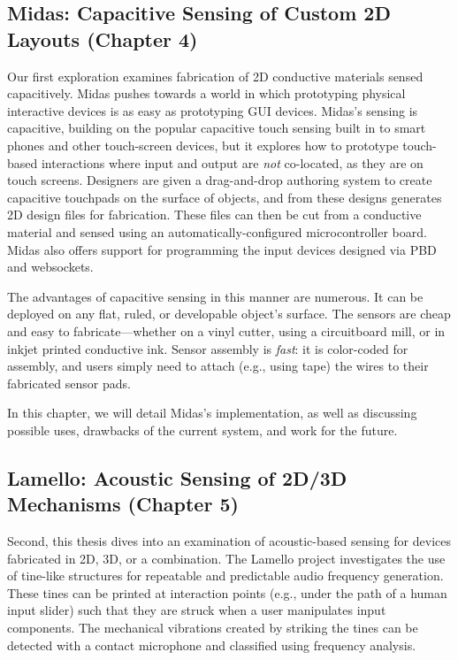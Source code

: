 
\subsection{Midas: Capacitive Sensing of Custom 2D Layouts (Chapter 4)}

Our first exploration examines fabrication of 2D conductive materials sensed capacitively. Midas pushes towards a world in which prototyping physical interactive devices is as easy as prototyping GUI devices. Midas's sensing is capacitive, building on the popular capacitive touch sensing built in to smart phones and other touch-screen devices, but it explores how to prototype touch-based interactions where input and output are \emph{not} co-located, as they are on touch screens. Designers are given a drag-and-drop authoring system to create capacitive touchpads on the surface of objects, and from these designs generates 2D design files for fabrication. These files can then be cut from a conductive material and sensed using an automatically-configured microcontroller board. Midas also offers support for programming the input devices designed via PBD and websockets.

The advantages of capacitive sensing in this manner are numerous. It can be deployed on any flat, ruled, or developable object's surface. The sensors are cheap and easy to fabricate---whether on a vinyl cutter, using a circuitboard mill, or in inkjet printed conductive ink. Sensor assembly is \emph{fast}: it is color-coded for assembly, and users simply need to attach (e.g., using tape) the wires to their fabricated sensor pads.

In this chapter, we will detail Midas's implementation, as well as discussing possible uses, drawbacks of the current system, and work for the future.

\subsection{Lamello: Acoustic Sensing of 2D/3D Mechanisms (Chapter 5)}

Second, this thesis dives into an examination of acoustic-based sensing for devices fabricated in 2D, 3D, or a combination. The Lamello project investigates the use of tine-like structures for repeatable and predictable audio frequency generation. These tines can be printed at interaction points (e.g., under the path of a human input slider) such that they are struck when a user manipulates input components. The mechanical vibrations created by striking the tines can be detected with a contact microphone and classified using frequency analysis.

